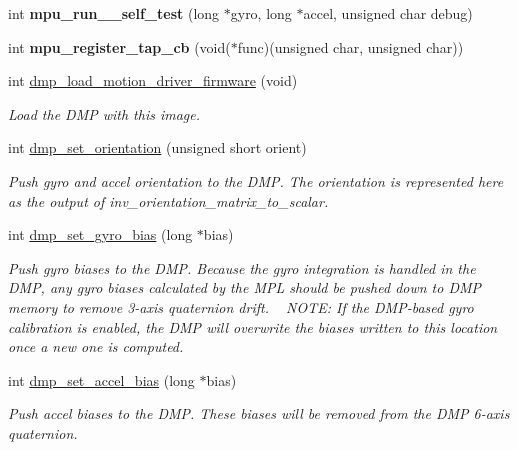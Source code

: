 \begin{DoxyCompactItemize}
\item 
int {\bfseries mpu\+\_\+run\+\_\+\_\+self\+\_\+test} (long $\ast$gyro, long $\ast$accel, unsigned char debug)\hypertarget{group___d_r_i_v_e_r_s_gac22890157bd3f7cc3752c0342f105b72}{}\label{group___d_r_i_v_e_r_s_gac22890157bd3f7cc3752c0342f105b72}

\item 
int {\bfseries mpu\+\_\+register\+\_\+tap\+\_\+cb} (void($\ast$func)(unsigned char, unsigned char))\hypertarget{group___d_r_i_v_e_r_s_ga0d528114a4e355a10ffd354a4c89a17f}{}\label{group___d_r_i_v_e_r_s_ga0d528114a4e355a10ffd354a4c89a17f}

\item 
int \hyperlink{group___d_r_i_v_e_r_s_ga66626a842452f444e9af29cb0d2c6150}{dmp\+\_\+load\+\_\+motion\+\_\+driver\+\_\+firmware} (void)
\begin{DoxyCompactList}\small\item\em Load the D\+MP with this image. \end{DoxyCompactList}\item 
int \hyperlink{group___d_r_i_v_e_r_s_ga6cb5ff144ce6e1546f00809de8bb24a4}{dmp\+\_\+set\+\_\+orientation} (unsigned short orient)
\begin{DoxyCompactList}\small\item\em Push gyro and accel orientation to the D\+MP. The orientation is represented here as the output of {\itshape inv\+\_\+orientation\+\_\+matrix\+\_\+to\+\_\+scalar}. \end{DoxyCompactList}\item 
int \hyperlink{group___d_r_i_v_e_r_s_ga4766e37ef95cbf0044c8f9594ed811d1}{dmp\+\_\+set\+\_\+gyro\+\_\+bias} (long $\ast$bias)
\begin{DoxyCompactList}\small\item\em Push gyro biases to the D\+MP. Because the gyro integration is handled in the D\+MP, any gyro biases calculated by the M\+PL should be pushed down to D\+MP memory to remove 3-\/axis quaternion drift. ~\newline
 N\+O\+TE\+: If the D\+M\+P-\/based gyro calibration is enabled, the D\+MP will overwrite the biases written to this location once a new one is computed. \end{DoxyCompactList}\item 
int \hyperlink{group___d_r_i_v_e_r_s_gafbd714aee6086836f70aaea847771669}{dmp\+\_\+set\+\_\+accel\+\_\+bias} (long $\ast$bias)
\begin{DoxyCompactList}\small\item\em Push accel biases to the D\+MP. These biases will be removed from the D\+MP 6-\/axis quaternion. \end{DoxyCompactList}\item 

\end{DoxyCompactItemize}
